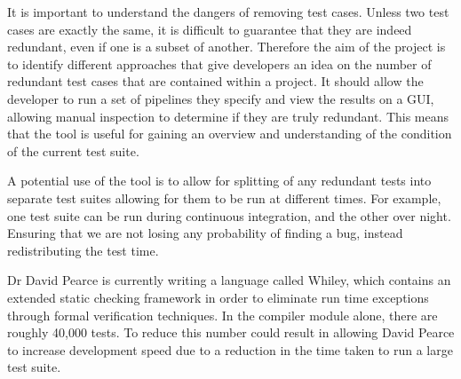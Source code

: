 It is important to understand the dangers of removing test cases. Unless two test cases are exactly the same, it is difficult to guarantee that they are indeed redundant, even if one is a subset of another. Therefore the aim of the project is to identify different approaches that give developers an idea on the number of redundant test cases that are contained within a project. It should allow the developer to run a set of pipelines they specify and view the results on a GUI, allowing manual inspection to determine if they are truly redundant. This means that the tool is useful for gaining an overview and understanding of the condition of the current test suite.

A potential use of the tool is to allow for splitting of any redundant tests into separate test suites allowing for them to be run at different times. For example, one test suite can be run during continuous integration, and the other over night. Ensuring that we are not losing any probability of finding a bug, instead redistributing the test time.

Dr David Pearce is currently writing a language called Whiley, which contains an extended static checking framework in order to eliminate run time exceptions through formal verification techniques. In the compiler module alone, there are roughly 40,000 tests. To reduce this number could result in allowing David Pearce to increase development speed due to a reduction in the time taken to run a large test suite. 